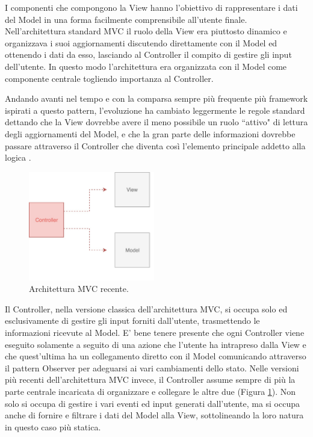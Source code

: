 I componenti che compongono la View hanno l'obiettivo di rappresentare i dati del Model in una forma facilmente comprensibile all'utente finale. Nell'architettura standard MVC il ruolo della View era piuttosto dinamico e organizzava i suoi aggiornamenti discutendo direttamente con il Model ed ottenendo i dati da esso, lasciando al Controller il compito di gestire gli input dell'utente. In questo modo l'architettura era organizzata con il Model come componente centrale togliendo importanza al Controller.

\noindent
Andando avanti nel tempo e con la comparsa sempre più frequente più framework ispirati a questo pattern, l'evoluzione ha cambiato leggermente le regole standard dettando che la View dovrebbe avere il meno possibile un ruolo “attivo" di lettura degli aggiornamenti del Model, e che la gran parte delle informazioni dovrebbe passare attraverso il Controller che diventa così l'elemento principale addetto alla logica \cite{HopkinsOnMVCandPHP}.

\begin{figure}
\centering 
\includegraphics[width=5.5cm]{./images/MVCpassiveview}
\caption{Architettura MVC recente.}
\label{MVCpassiveview}
\end{figure}

Il Controller, nella versione classica dell'architettura MVC, si occupa solo ed esclusivamente di gestire gli input forniti dall'utente, trasmettendo le informazioni ricevute al Model. E' bene tenere presente che ogni Controller viene eseguito solamente a seguito di una azione che l'utente ha intrapreso dalla View e che quest'ultima ha un collegamento diretto con il Model comunicando attraverso il pattern Observer per adeguarsi ai vari cambiamenti dello stato.
Nelle versioni più recenti dell'architettura MVC invece, il Controller assume sempre di più la parte centrale incaricata di organizzare e collegare le altre due (Figura \ref{MVCpassiveview}). Non solo si occupa di gestire i vari eventi ed input generati dall'utente, ma si occupa anche di fornire e filtrare i dati del Model alla View, sottolineando la loro natura in questo caso più statica.

